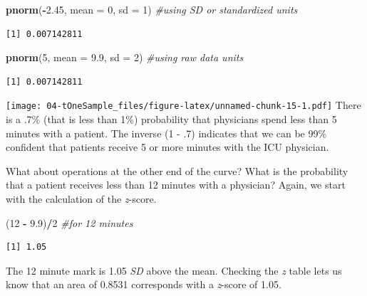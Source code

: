\documentclass[
  11pt,
]{book}
\newenvironment{Shaded}{\begin{snugshade}}{\end{snugshade}}
\newcommand{\AttributeTok}[1]{\textcolor[rgb]{0.27,0.27,0.27}{#1}}
\newcommand{\CommentTok}[1]{\textcolor[rgb]{0.37,0.37,0.37}{\textit{#1}}}
\newcommand{\DecValTok}[1]{\textcolor[rgb]{0.06,0.06,0.06}{#1}}
\newcommand{\FloatTok}[1]{\textcolor[rgb]{0.06,0.06,0.06}{#1}}
\newcommand{\FunctionTok}[1]{\textcolor[rgb]{0.27,0.27,0.27}{\textbf{#1}}}
\newcommand{\NormalTok}[1]{#1}
\newcommand{\SpecialCharTok}[1]{\textcolor[rgb]{0.43,0.43,0.43}{\textbf{#1}}}
\begin{document}
\begin{Shaded}
\begin{Highlighting}[]
\FunctionTok{pnorm}\NormalTok{(}\SpecialCharTok{{-}}\FloatTok{2.45}\NormalTok{, }\AttributeTok{mean =} \DecValTok{0}\NormalTok{, }\AttributeTok{sd =} \DecValTok{1}\NormalTok{)  }\CommentTok{\#using SD or standardized units}
\end{Highlighting}
\end{Shaded}

\begin{verbatim}
[1] 0.007142811
\end{verbatim}

\begin{Shaded}
\begin{Highlighting}[]
\FunctionTok{pnorm}\NormalTok{(}\DecValTok{5}\NormalTok{, }\AttributeTok{mean =} \FloatTok{9.9}\NormalTok{, }\AttributeTok{sd =} \DecValTok{2}\NormalTok{)  }\CommentTok{\#using raw data units}
\end{Highlighting}
\end{Shaded}

\begin{verbatim}
[1] 0.007142811
\end{verbatim}

\texttt{[image: 04-tOneSample\_files/figure-latex/unnamed-chunk-15-1.pdf]} There is a .7\% (that is less than 1\%) probability that physicians spend less than 5 minutes with a patient. The inverse (1 - .7) indicates that we can be 99\% confident that patients receive 5 or more minutes with the ICU physician.

What about operations at the other end of the curve? What is the probability that a patient receives less than 12 minutes with a physician? Again, we start with the calculation of the \emph{z}-score.

\begin{Shaded}
\begin{Highlighting}[]
\NormalTok{(}\DecValTok{12} \SpecialCharTok{{-}} \FloatTok{9.9}\NormalTok{)}\SpecialCharTok{/}\DecValTok{2}  \CommentTok{\#for 12 minutes}
\end{Highlighting}
\end{Shaded}

\begin{verbatim}
[1] 1.05
\end{verbatim}

The 12 minute mark is 1.05 \emph{SD} above the mean. Checking the \emph{z} table lets us know that an area of 0.8531 corresponds with a \emph{z}-score of 1.05.
\end{document}
